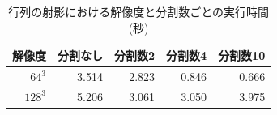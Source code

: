 \documentclass[uplatex,dvipdfmx,10pt,a4paper,notitlepage,oneside,twocolumn]{abst_jsarticle}
\begin{document}
\begin {table}[htbp]
    \centering
  \caption{行列の射影における解像度と分割数ごとの実行時間(秒)}
  \label{tab:projection}
  \begin {tabular}{rrrrr} \hline
    \multicolumn{1}{c}{解像度} 					&\multicolumn{1}{c}{分割なし} 		&\multicolumn{1}{c}{分割数2}			&\multicolumn{1}{c}{分割数4} 		&\multicolumn{1}{c}{分割数10}\\ \hline
    $64^3$ 					& 3.514 			&2.823	 		&0.846	 		&0.666\\
    $128^3$ 				& 5.206 			& 3.061 			& 3.050 		&3.975\\ \hline
  \end {tabular}
\end {table}

\end{document}
